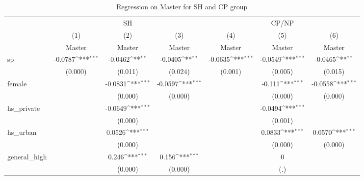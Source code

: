 \documentclass[]{AEA}
\def\sym#1{\ifmmode^{#1}\else\(^{#1}\)\fi}
\begin{document}
    \begin{center}
    \begin{table}
    \caption{Regression on Master for SH and CP group}
    \setlength{\tabcolsep}{0.5mm}
    \begin{tabular}{l*{6}c}
    \toprule
    &\multicolumn{3}{c}{SH} &\multicolumn{3}{c}{CP/NP} \\
    \cmidrule(l){2-4}\cmidrule(l){5-7}
    &\multicolumn{1}{c}{(1)}&\multicolumn{1}{c}{(2)}&\multicolumn{1}{c}{(3)}&\multicolumn{1}{c}{(4)}&\multicolumn{1}{c}{(5)}&\multicolumn{1}{c}{(6)} \\
    &\multicolumn{1}{c}{Master}&\multicolumn{1}{c}{Master}&\multicolumn{1}{c}{Master}&\multicolumn{1}{c}{Master}&\multicolumn{1}{c}{Master}&\multicolumn{1}{c}{Master} \\
    \midrule
    sp          &     -0.0787\sym{***}&     -0.0462\sym{**} &     -0.0405\sym{**} &     -0.0635\sym{***}&     -0.0549\sym{***}&     -0.0465\sym{**} \\
            &     (0.000)         &     (0.011)         &     (0.024)         &     (0.001)         &     (0.005)         &     (0.015)         \\
    [1em]
    female      &                     &     -0.0831\sym{***}&     -0.0597\sym{***}&                     &      -0.111\sym{***}&     -0.0558\sym{***}\\
                &                     &     (0.000)         &     (0.000)         &                     &     (0.000)         &     (0.000)         \\
    [1em]
    hs\_private  &                     &     -0.0649\sym{***}&                     &                     &     -0.0494\sym{***}&                     \\
                &                     &     (0.000)         &                     &                     &     (0.001)         &                     \\
    [1em]
    hs\_urban    &                     &      0.0526\sym{***}&                     &                     &      0.0833\sym{***}&      0.0570\sym{***}\\
                &                     &     (0.000)         &                     &                     &     (0.000)         &     (0.000)         \\
    [1em]
    general\_high&                     &       0.246\sym{***}&       0.156\sym{***}&                     &           0         &                     \\
                &                     &     (0.000)         &     (0.000)         &                     &         (.)         &                     \\

\end{tabular}
\end{table}
\end{center}
\end{document}
